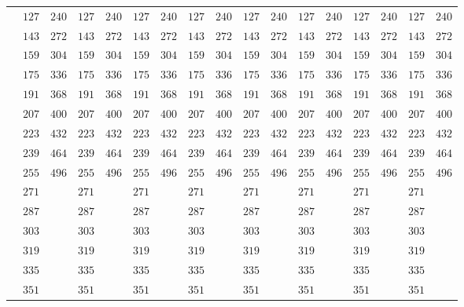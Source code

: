 \begin{table}[h]
\begin{tabular}{l|l|l|l|l|l|l|l|l|l|l|l|l|l|l|l|l}
&  $127$ &  $240$ &  $127$ &  $240$ &  $127$ &  $240$ &  $127$ &  $240$ &  $127$ &  $240$ &  $127$ &  $240$ &  $127$ &  $240$ &  $127$ &  $240$ \\
&  $143$ &  $272$ &  $143$ &  $272$ &  $143$ &  $272$ &  $143$ &  $272$ &  $143$ &  $272$ &  $143$ &  $272$ &  $143$ &  $272$ &  $143$ &  $272$ \\
&  $159$ &  $304$ &  $159$ &  $304$ &  $159$ &  $304$ &  $159$ &  $304$ &  $159$ &  $304$ &  $159$ &  $304$ &  $159$ &  $304$ &  $159$ &  $304$ \\
&  $175$ &  $336$ &  $175$ &  $336$ &  $175$ &  $336$ &  $175$ &  $336$ &  $175$ &  $336$ &  $175$ &  $336$ &  $175$ &  $336$ &  $175$ &  $336$ \\
&  $191$ &  $368$ &  $191$ &  $368$ &  $191$ &  $368$ &  $191$ &  $368$ &  $191$ &  $368$ &  $191$ &  $368$ &  $191$ &  $368$ &  $191$ &  $368$ \\
&  $207$ &  $400$ &  $207$ &  $400$ &  $207$ &  $400$ &  $207$ &  $400$ &  $207$ &  $400$ &  $207$ &  $400$ &  $207$ &  $400$ &  $207$ &  $400$ \\
&  $223$ &  $432$ &  $223$ &  $432$ &  $223$ &  $432$ &  $223$ &  $432$ &  $223$ &  $432$ &  $223$ &  $432$ &  $223$ &  $432$ &  $223$ &  $432$ \\
&  $239$ &  $464$ &  $239$ &  $464$ &  $239$ &  $464$ &  $239$ &  $464$ &  $239$ &  $464$ &  $239$ &  $464$ &  $239$ &  $464$ &  $239$ &  $464$ \\
&  $255$ &  $496$ &  $255$ &  $496$ &  $255$ &  $496$ &  $255$ &  $496$ &  $255$ &  $496$ &  $255$ &  $496$ &  $255$ &  $496$ &  $255$ &  $496$ \\
&  $271$ &      &  $271$ &      &  $271$ &      &  $271$ &      &  $271$ &      &  $271$ &      &  $271$ &      &  $271$ &      \\
&  $287$ &      &  $287$ &      &  $287$ &      &  $287$ &      &  $287$ &      &  $287$ &      &  $287$ &      &  $287$ &      \\
&  $303$ &      &  $303$ &      &  $303$ &      &  $303$ &      &  $303$ &      &  $303$ &      &  $303$ &      &  $303$ &      \\
&  $319$ &      &  $319$ &      &  $319$ &      &  $319$ &      &  $319$ &      &  $319$ &      &  $319$ &      &  $319$ &      \\
&  $335$ &      &  $335$ &      &  $335$ &      &  $335$ &      &  $335$ &      &  $335$ &      &  $335$ &      &  $335$ &      \\
&  $351$ &      &  $351$ &      &  $351$ &      &  $351$ &      &  $351$ &      &  $351$ &      &  $351$ &      &  $351$ &      \\

\end{tabular}
\end{table}
